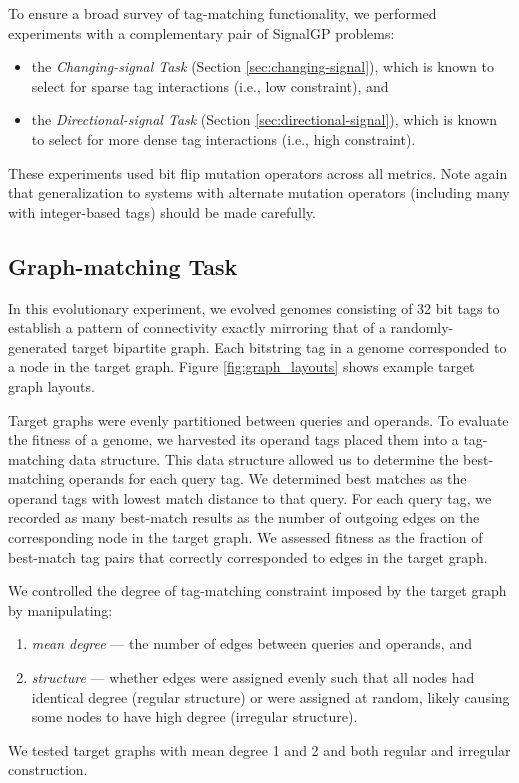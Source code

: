 To ensure a broad survey of tag-matching functionality, we performed experiments with a complementary pair of SignalGP problems:
\begin{itemize}
    \item the \textit{Changing-signal Task} (Section \ref{sec:changing-signal}), which is known to select for sparse tag interactions (i.e., low constraint), and
    \item the \textit{Directional-signal Task} (Section \ref{sec:directional-signal}), which is known to select for more dense tag interactions (i.e., high constraint).
\end{itemize}

These experiments used bit flip mutation operators across all metrics.
Note again that generalization to systems with alternate mutation operators (including many with integer-based tags) should be made carefully.

\subsection{Graph-matching Task} \label{sec:graph-matching}





In this evolutionary experiment, we evolved genomes consisting of 32 bit tags to establish a pattern of connectivity exactly mirroring that of a randomly-generated target bipartite graph.
Each bitstring tag in a genome corresponded to a node in the target graph.
Figure \ref{fig:graph_layouts} shows example target graph layouts.

Target graphs were evenly partitioned between queries and operands.
To evaluate the fitness of a genome, we harvested its operand tags placed them into a tag-matching data structure.
This data structure allowed us to determine the best-matching operands for each query tag.
We determined best matches as the operand tags with lowest match distance to that query.
For each query tag, we recorded as many best-match results as the number of outgoing edges on the corresponding node in the target graph.
We assessed fitness as the fraction of best-match tag pairs that correctly corresponded to edges in the target graph.

We controlled the degree of tag-matching constraint imposed by the target graph by manipulating:
\begin{enumerate}
  \item \textit{mean degree} --- the number of edges between queries and operands, and
  \item \textit{structure} --- whether edges were assigned evenly such that all nodes had identical degree (regular structure) or were assigned at random, likely causing some nodes to have high degree (irregular structure).
\end{enumerate}
We tested target graphs with mean degree 1 and 2 and both regular and irregular construction.

